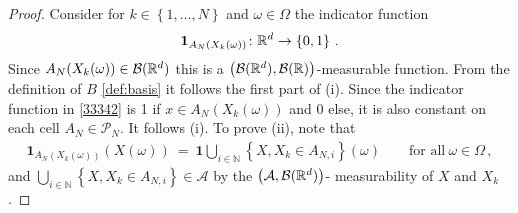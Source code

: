 \begin{proof}
Consider
for $k\in \left\{
  1,\ldots,N
\right\}$
and $\omega\in\Omega$
the indicator function
\begin{align}
  \label{33342}
  \mathbf{1}
  _
  {A_N(X_k(\omega))}
  \colon \mathbb{R}^d\to \left\{
    0,1
  \right\}
  \,.
\end{align}
Since 
$
  {A_N(X_k(\omega))}
  \in\mathcal{B}(\mathbb{R}^d)
$
this is a 
  $\left(
    \mathcal{B}(\mathbb{R}^d),\mathcal{B}(\mathbb{R})
  \right)$-measurable
  function.
  From the definition of $B$ \eqref{def:basis} it follows the first part of (i).
  Since the indicator function in \eqref{33342} is 1 if $
  x\in
  {A_N(X_k(\omega))}
  $
  and 0 else, it is also constant on each cell
  $A_N\in\mathcal{P}_N$.
  It follows (i).
  To prove (ii), note that
\begin{align*}
  \mathbf{1}
  _
  {A_N(X_k(\omega))}(X(\omega))
  \ 
  =
  \ 
  \mathbf{1}
  \bigcup_{i\in\mathbb{N}}
  \left\{
    X,X_k \in A_{N,i}
  \right\}
  (\omega)
  \qquad
  \text{for all}\ 
  \omega\in\Omega
  \,,
\end{align*}
and
$
  \bigcup_{i\in\mathbb{N}}
  \left\{
    X,X_k \in A_{N,i}
  \right\}
  \in\mathcal{A}
$ by the 
$
\left( 
  \mathcal{A},
  \mathcal{B}(\mathbb{R}^d)
\right)
$-
measurability of $X$ and $X_k$.
\end{proof}

